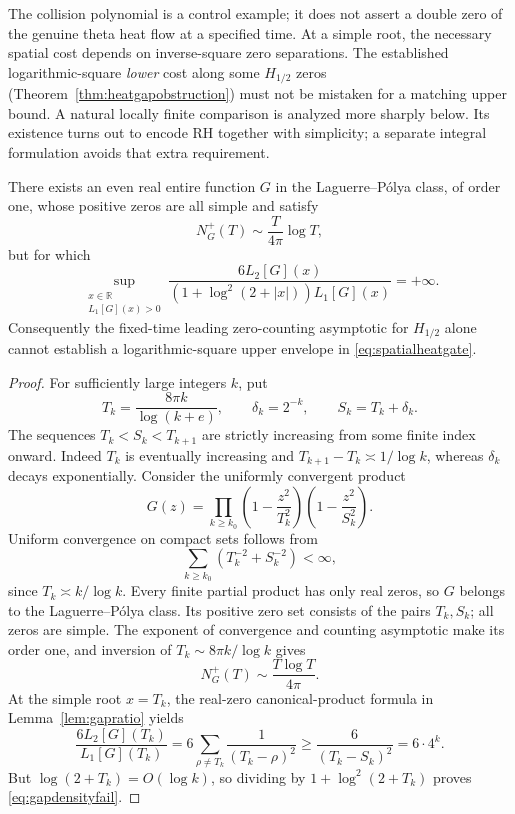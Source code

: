 The collision polynomial is a control example;
it does not assert a double zero of the
genuine theta heat flow at a specified time.
At a simple root, the necessary spatial cost
depends on inverse-square zero separations.
The established logarithmic-square
\emph{lower} cost along some $H_{1/2}$
zeros (Theorem~\ref{thm:heatgapobstruction})
must not be mistaken for a matching
upper bound. A natural locally finite comparison is analyzed
more sharply below. Its existence turns out to
encode RH together with simplicity; a separate
integral formulation avoids that extra requirement.

\begin{theorem}\label{thm:gapdensity}
There exists an even real entire function $G$ in the
Laguerre--P\'olya class, of order one, whose positive
zeros are all simple and satisfy
\[
N_G^+(T)\sim\frac{T}{4\pi}\log T,
\]
but for which
\begin{equation}
\sup_{\substack{x\in\mathbb R\\L_1[G](x)>0}}
\frac{6L_2[G](x)}
{(1+\log^2(2+|x|))L_1[G](x)}
=+\infty.
\label{eq:gapdensityfail}
\end{equation}
Consequently the fixed-time leading zero-counting
asymptotic for $H_{1/2}$ alone cannot establish
a logarithmic-square upper envelope in
\eqref{eq:spatialheatgate}.
\end{theorem}
\begin{proof}
For sufficiently large integers $k$, put
\[
T_k=\frac{8\pi k}{\log(k+e)},\qquad
\delta_k=2^{-k},\qquad S_k=T_k+\delta_k.
\]
The sequences $T_k<S_k<T_{k+1}$ are strictly
increasing from some finite index onward.
Indeed $T_k$ is eventually increasing and
$T_{k+1}-T_k\asymp1/\log k$, whereas
$\delta_k$ decays exponentially.
Consider the uniformly convergent product
\[
G(z)=\prod_{k\ge k_0}
\left(1-\frac{z^2}{T_k^2}\right)
\left(1-\frac{z^2}{S_k^2}\right).
\]
Uniform convergence on compact sets follows from
\[
\sum_{k\ge k_0}
(T_k^{-2}+S_k^{-2})<\infty,
\]
since $T_k\asymp k/\log k$.
Every finite partial product has only real zeros,
so $G$ belongs to the Laguerre--P\'olya class.
Its positive zero set consists of the pairs
$T_k,S_k$; all zeros are simple. The exponent
of convergence and counting asymptotic make
its order one, and inversion of
$T_k\sim8\pi k/\log k$ gives
\[
N_G^+(T)\sim
\frac{T\log T}{4\pi}.
\]
At the simple root $x=T_k$, the real-zero
canonical-product formula in
Lemma~\ref{lem:gapratio} yields
\[
\frac{6L_2[G](T_k)}{L_1[G](T_k)}
=6\sum_{\rho\ne T_k}
\frac1{(T_k-\rho)^2}
\ge\frac6{(T_k-S_k)^2}
=6\cdot4^k.
\]
But $\log(2+T_k)=O(\log k)$, so dividing
by $1+\log^2(2+T_k)$ proves
\eqref{eq:gapdensityfail}.
\end{proof}

